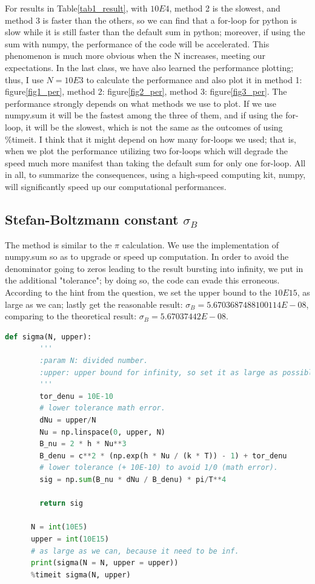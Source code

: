 \documentclass[12pt]{article}
\begin{document}
    For results in Table\ref{tab1_result}, with $10E4$, method 2 is the slowest, and method 3 is faster than the others, so we can find that a for-loop for python is slow while it is still faster than the default sum in python; moreover, if using the sum with numpy, the performance of the code will be accelerated. This phenomenon is much more obvious when the N increases, meeting our expectations. In the last class, we have also learned the performance plotting; thus, I use $N = 10E3$ to calculate the performance and also plot it in method 1: figure\ref{fig1_per}, method 2: figure\ref{fig2_per}, method 3: figure\ref{fig3_per}. The performance strongly depends on what methods we use to plot. If we use {\ttfamily numpy.sum} it will be the fastest among the three of them, and if using the for-loop, it will be the slowest, which is not the same as the outcomes of using {\ttfamily \%timeit}. I think that it might depend on how many for-loops we used; that is, when we plot the performance utilizing two for-loops which will degrade the speed much more manifest than taking the default {\ttfamily sum} for only one for-loop. All in all, to summarize the consequences, using a high-speed computing kit, numpy, will significantly speed up our computational performances.
  
  \subsection{Stefan-Boltzmann constant $\sigma_{B}$}
    The method is similar to the $\pi$ calculation. We use the implementation of {\ttfamily numpy.sum} so as to upgrade or speed up computation. In order to avoid the denominator going to zeros leading to the result bursting into infinity, we put in the additional "tolerance"; by doing so, the code can evade this erroneous. According to the hint from the question, we set the upper bound to the $10E15$, as large as we can; lastly get the reasonable result: $\sigma_{B} = 5.6703687488100114E-08$, comparing to the theoretical result: $\sigma_{B} = 5.67037442E-08$.
    
    \begin{lstlisting}[language={Python}, caption={The Stefan-Boltzmann constant $\sigma_{B}$ calculation, performance = $15.6ms \pm 312 \mu s$.}]
        def sigma(N, upper):
        '''
        :param N: divided number.
        :upper: upper bound for infinity, so set it as large as possible.
        '''
        tor_denu = 10E-10
        # lower tolerance math error.
        dNu = upper/N
        Nu = np.linspace(0, upper, N)
        B_nu = 2 * h * Nu**3
        B_denu = c**2 * (np.exp(h * Nu / (k * T)) - 1) + tor_denu
        # lower tolerance (+ 10E-10) to avoid 1/0 (math error).
        sig = np.sum(B_nu * dNu / B_denu) * pi/T**4
      
        return sig
      
      N = int(10E5)
      upper = int(10E15) 
      # as large as we can, because it need to be inf.
      print(sigma(N = N, upper = upper))
      %timeit sigma(N, upper)
    \end{lstlisting}
\end{document}
